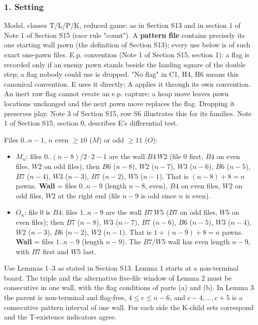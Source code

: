 \subsubsection*{1. Setting}
Model, classes T/L/P/K, reduced game: as in Section S13 and in section 1 of Note 1 of Section S15 (race rule "count"). A \textbf{pattern file} contains precisely its one starting wall pawn (the definition of Section S13); every use below is of such exact one-pawn files. E.p. convention (Note 1 of Section S15, section 1): a flag is recorded only if an enemy pawn stands beside the landing square of the double step; a flag nobody could use is dropped. "No flag" in C1, H4, H6 means this canonical convention. E uses it directly; A applies it through its own convention. An inert raw flag cannot create an e.p. capture: a heap move leaves pawn locations unchanged and the next pawn move replaces the flag. Dropping it preserves play. Note 3 of Section S15, row S6 illustrates this for its families. Note 1 of Section S15, section 0, describes E's differential test.

Files $0..n-1$, $n$ even $\ge10$ ($M$) or odd $\ge11$ ($O$):

\begin{itemize}
\item $M_n$: files $0..(n-8)/2\cdot 2-1$ are the wall $B4\,W2$ (file $0$ first, $B4$ on even files, $W2$ on odd files), then $B6$ ($n-8$), $W2$ ($n-7$), $W3$ ($n-6$), $B6$ ($n-5$), $B7$ ($n-4$), $W3$ ($n-3$), $B7$ ($n-2$), $W5$ ($n-1$). That is $(n-8)+8 = n$ pawns. \textbf{Wall} = files $0..n-9$ (length $n-8$, even), $B4$ on even files, $W2$ on odd files, $W2$ at the right end (file $n-9$ is odd since $n$ is even).
\item $O_n$: file $0$ is $B4$; files $1..n-9$ are the wall $B7\,W5$ ($B7$ on odd files, $W5$ on even files); then $B7$ ($n-8$), $W3$ ($n-7$), $B7$ ($n-6$), $B6$ ($n-5$), $W3$ ($n-4$), $W2$ ($n-3$), $B6$ ($n-2$), $W2$ ($n-1$). That is $1+(n-9)+8 = n$ pawns. \textbf{Wall} = files $1..n-9$ (length $n-9$). The $B7/W5$ wall has even length $n-9$, with $B7$ first and $W5$ last.
\end{itemize}
Use Lemmas 1–3 as stated in Section S13. Lemma 1 starts at a non-terminal board. The triple and the alternative five-file window of Lemma 2 must be consecutive in one wall, with the flag conditions of parts (a) and (b). In Lemma 3 the parent is non-terminal and flag-free, $4\le c\le n-6$, and $c-4,\dots,c+5$ is a consecutive pattern interval of one wall. For each side the K-child sets correspond and the T-existence indicators agree.

